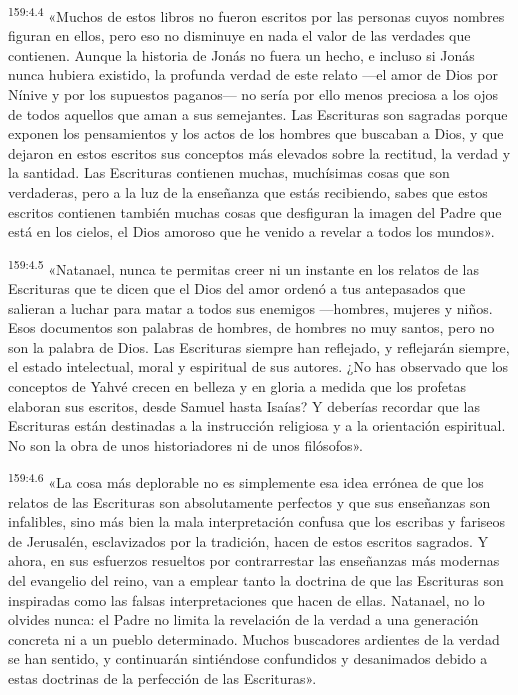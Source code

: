 \par 
\textsuperscript{159:4.4} «Muchos de estos libros no fueron escritos por las personas cuyos nombres figuran en ellos, pero eso no disminuye en nada el valor de las verdades que contienen. Aunque la historia de Jonás no fuera un hecho, e incluso si Jonás nunca hubiera existido, la profunda verdad de este relato ---el amor de Dios por Nínive y por los supuestos paganos--- no sería por ello menos preciosa a los ojos de todos aquellos que aman a sus semejantes. Las Escrituras son sagradas porque exponen los pensamientos y los actos de los hombres que buscaban a Dios, y que dejaron en estos escritos sus conceptos más elevados sobre la rectitud, la verdad y la santidad. Las Escrituras contienen muchas, muchísimas cosas que son verdaderas, pero a la luz de la enseñanza que estás recibiendo, sabes que estos escritos contienen también muchas cosas que desfiguran la imagen del Padre que está en los cielos, el Dios amoroso que he venido a revelar a todos los mundos».

\par 
\textsuperscript{159:4.5} «Natanael, nunca te permitas creer ni un instante en los relatos de las Escrituras que te dicen que el Dios del amor ordenó a tus antepasados que salieran a luchar para matar a todos sus enemigos ---hombres, mujeres y niños. Esos documentos son palabras de hombres, de hombres no muy santos, pero no son la palabra de Dios. Las Escrituras siempre han reflejado, y reflejarán siempre, el estado intelectual, moral y espiritual de sus autores. ¿No has observado que los conceptos de Yahvé crecen en belleza y en gloria a medida que los profetas elaboran sus escritos, desde Samuel hasta Isaías? Y deberías recordar que las Escrituras están destinadas a la instrucción religiosa y a la orientación espiritual. No son la obra de unos historiadores ni de unos filósofos».

\par 
\textsuperscript{159:4.6} «La cosa más deplorable no es simplemente esa idea errónea de que los relatos de las Escrituras son absolutamente perfectos y que sus enseñanzas son infalibles, sino más bien la mala interpretación confusa que los escribas y fariseos de Jerusalén, esclavizados por la tradición, hacen de estos escritos sagrados. Y ahora, en sus esfuerzos resueltos por contrarrestar las enseñanzas más modernas del evangelio del reino, van a emplear tanto la doctrina de que las Escrituras son inspiradas como las falsas interpretaciones que hacen de ellas. Natanael, no lo olvides nunca: el Padre no limita la revelación de la verdad a una generación concreta ni a un pueblo determinado. Muchos buscadores ardientes de la verdad se han sentido, y continuarán sintiéndose confundidos y desanimados debido a estas doctrinas de la perfección de las Escrituras».


